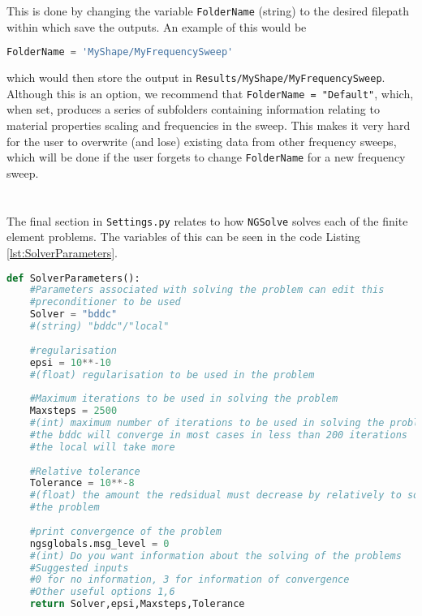 \noindent
This is done by changing the variable \texttt{FolderName} (string) to the desired filepath within which save the outputs. An example of this would be
\begin{lstlisting}[language=Python]
FolderName = 'MyShape/MyFrequencySweep'
\end{lstlisting}
which would then store the output in \texttt{Results/MyShape/MyFrequencySweep}. Although this is an option, we recommend that \texttt{FolderName = "Default"}, which, when set, produces a series of subfolders containing information relating to material properties scaling and frequencies in the sweep. This makes it very hard for the user to overwrite (and lose) existing data from other frequency sweeps, which will be done if the user forgets to change \texttt{FolderName} for a new frequency sweep.\\
\\
\\
\noindent
The final section in \texttt{Settings.py} relates to how \texttt{NGSolve} solves each of the finite element problems. The variables of this can be seen in the code Listing \ref{lst:SolverParameters}.
\clearpage
\begin{lstlisting}[language=Python, caption={SolverParameters Definition}, label={lst:SolverParameters}]
def SolverParameters():
    #Parameters associated with solving the problem can edit this
    #preconditioner to be used
    Solver = "bddc"
    #(string) "bddc"/"local"
    
    #regularisation
    epsi = 10**-10
    #(float) regularisation to be used in the problem
    
    #Maximum iterations to be used in solving the problem
    Maxsteps = 2500
    #(int) maximum number of iterations to be used in solving the problem
    #the bddc will converge in most cases in less than 200 iterations
    #the local will take more
    
    #Relative tolerance
    Tolerance = 10**-8
    #(float) the amount the redsidual must decrease by relatively to solve
    #the problem
    
    #print convergence of the problem
    ngsglobals.msg_level = 0
    #(int) Do you want information about the solving of the problems
    #Suggested inputs
    #0 for no information, 3 for information of convergence
    #Other useful options 1,6
    return Solver,epsi,Maxsteps,Tolerance
\end{lstlisting}


